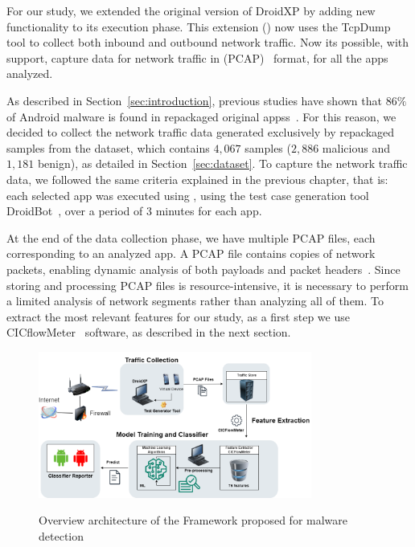 For our study, we extended the original version of DroidXP by adding new functionality to its execution phase. This extension (\droidxpflow) now uses the TcpDump tool to collect both inbound and outbound network traffic. Now its possible, with \droidxpflow support, capture data for network traffic in (PCAP)~\cite{DBLP:conf/iv/UhlarHR21} format, for all the apps analyzed.


As described in Section~\ref{sec:introduction}, previous studies have shown that $86\%$ of Android malware is found in repackaged original appss~\cite{DBLP:journals/tdsc/TianYRTP20,DBLP:conf/sp/ZhouJ12}. For this reason, we decided to collect the network traffic data generated exclusively by repackaged samples from the \cds dataset, which contains $4,067$ samples ($2,886$ malicious and $1,181$ benign), as detailed in Section~\ref{sec:dataset}. To capture the network traffic data, we followed the same criteria explained in the previous chapter, that is: each selected app was executed using \droidxpflow, using the test case generation tool DroidBot~\cite{DBLP:conf/icse/LiYGC17}, over a period of $3$ minutes for each app.

At the end of the data collection phase, we have multiple PCAP files, each corresponding to an analyzed app. A PCAP file contains copies of network packets, enabling dynamic analysis of both payloads and packet headers~\cite{DBLP:conf/iv/UhlarHR21}. Since storing and processing PCAP files is resource-intensive, it is necessary to perform a limited analysis of network segments rather than analyzing all of them. To extract the most relevant features for our study, as a first step we use CICflowMeter~\cite{DBLP:conf/icissp/LashkariDMG17} software, as described in the next section.






\begin{figure}[h]
  \centering
  
    \includegraphics[width=0.80\textwidth]{image/archic.png} \\[\abovecaptionskip]
    
  \caption{Overview architecture of the \droidxpflow Framework proposed for malware detection}\label{fig:arq}
\end{figure}




